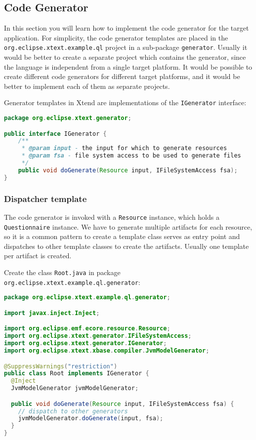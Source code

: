 \subsection{Code Generator}

In this section you will learn how to implement the code generator for 
the target application. For simplicity, the code generator templates are placed
in the \texttt{org.eclipse.xtext.example.ql} project in a sub-package \texttt{generator}. 
Usually it would be better to create a separate project which contains the generator,
since the language is independent from a single target platform. It would
be possible to create different code generators for different target platforms,
and it would be better to implement each of them as separate projects.

Generator templates in Xtend are implementations of the \texttt{IGenerator}
interface:

\begin{lstlisting}[language=Java]
package org.eclipse.xtext.generator;

public interface IGenerator {
	/**
	 * @param input - the input for which to generate resources
	 * @param fsa - file system access to be used to generate files
	 */
	public void doGenerate(Resource input, IFileSystemAccess fsa);
}
\end{lstlisting}

\subsubsection {Dispatcher template}

The code generator is invoked with a \texttt{Resource} instance, which holds a \texttt{Questionnaire}
instance. We have to generate multiple artifacts for each resource, so it is a common 
pattern to create a template class serves as entry point and dispatches to other
template classes to create the artifacts. Usually one template per artifact is
created.

Create the class \texttt{Root.java} in package \texttt{org.eclipse.xtext.example.ql.generator}:

\begin{lstlisting}[language=Java]
package org.eclipse.xtext.example.ql.generator;

import javax.inject.Inject;

import org.eclipse.emf.ecore.resource.Resource;
import org.eclipse.xtext.generator.IFileSystemAccess;
import org.eclipse.xtext.generator.IGenerator;
import org.eclipse.xtext.xbase.compiler.JvmModelGenerator;

@SuppressWarnings("restriction")
public class Root implements IGenerator {
  @Inject
  JvmModelGenerator jvmModelGenerator;

  public void doGenerate(Resource input, IFileSystemAccess fsa) {
    // dispatch to other generators
    jvmModelGenerator.doGenerate(input, fsa);
  }
}
\end{lstlisting}

